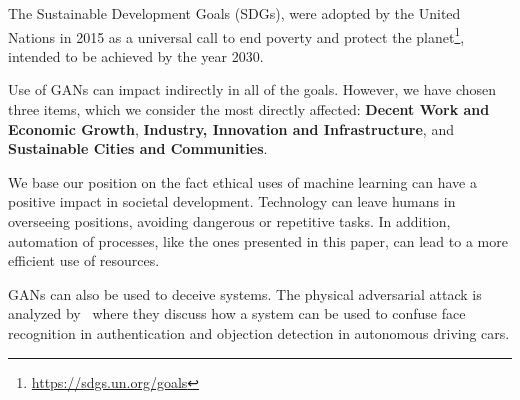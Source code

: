 \documentclass[12pt]{article}
\begin{document}
    The Sustainable Development Goals (SDGs), were adopted by the United Nations in 2015 as a universal call
    to end poverty and protect the planet\footnote{\url{https://sdgs.un.org/goals}}, intended to be achieved by the year 2030.

    Use of GANs can impact indirectly in all of the goals.
    However, we have chosen three items, which we consider the most directly affected:
    \textbf{Decent Work and Economic Growth}, \textbf{Industry, Innovation and Infrastructure}, and
    \textbf{Sustainable Cities and Communities}.

    We base our position on the fact ethical uses of machine learning can have a positive impact in societal development.
    Technology can leave humans in overseeing positions, avoiding dangerous or repetitive tasks.
    In addition, automation of processes, like the ones presented in this paper, can lead to a more efficient use of resources.

    GANs can also be used to deceive systems.
    The physical adversarial attack is analyzed by~\cite{arxiv:1812.10217} where they discuss
    how a system can be used to confuse face recognition in authentication and objection detection in autonomous driving cars.
\end{document}
